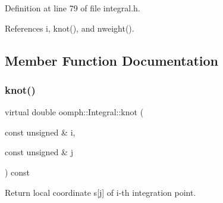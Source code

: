 Definition at line 79 of file integral.\+h.



References i, knot(), and nweight().



\subsection{Member Function Documentation}
\mbox{\label{classoomph_1_1Integral_a1a2122f99a87c18649bafdd9ed739758}} 
\subsubsection{\texorpdfstring{knot()}{knot()}\hspace{0.1cm}{\footnotesize\ttfamily [1/2]}}
{\footnotesize\ttfamily virtual double oomph\+::\+Integral\+::knot (\begin{DoxyParamCaption}\item[{const unsigned \&}]{i,  }\item[{const unsigned \&}]{j }\end{DoxyParamCaption}) const\hspace{0.3cm}{\ttfamily [pure virtual]}}



Return local coordinate s\mbox{[}j\mbox{]} of i-\/th integration point. 




